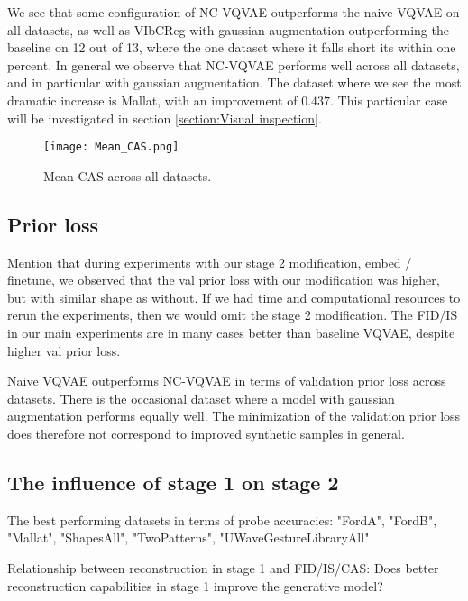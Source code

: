 \documentclass[../../thesis.tex]{subfiles}
\begin{document}
We see that some configuration of NC-VQVAE outperforms the naive VQVAE on all datasets, as well as VIbCReg with gaussian augmentation outperforming the baseline on 12 out of 13, where the one dataset where it falls short its within one percent. In general we observe that NC-VQVAE performs well across all datasets, and in particular with gaussian augmentation. The dataset where we see the most dramatic increase is Mallat, with an improvement of $0.437$. This particular case will be investigated in section \ref{section:Visual inspection}.  

\begin{figure}[h]
    \texttt{[image: Mean\_CAS.png]}
    \centering  
    \caption{Mean CAS across all datasets.}
    \label{fig:Mean_CAS}
\end{figure}





\subsection{Prior loss}
Mention that during experiments with our stage 2 modification, embed / finetune, we observed that the val prior loss with our modification was higher, but with similar shape as without. If we had time and computational resources to rerun the experiments, then we would omit the stage 2 modification. The FID/IS in our main experiments are in many cases better than baseline VQVAE, despite higher val prior loss.
\newline

Naive VQVAE outperforms NC-VQVAE in terms of validation prior loss across datasets. There is the occasional dataset where a model with gaussian augmentation performs equally well. The minimization of the validation prior loss does therefore not correspond to improved synthetic samples in general.



\subsection{The influence of stage 1 on stage 2}
The best performing datasets in terms of probe accuracies: "FordA", "FordB", "Mallat", "ShapesAll", "TwoPatterns", "UWaveGestureLibraryAll"\newline

Relationship between reconstruction in stage 1 and FID/IS/CAS:
Does better reconstruction capabilities in stage 1 improve the generative model?\newline
\end{document}
